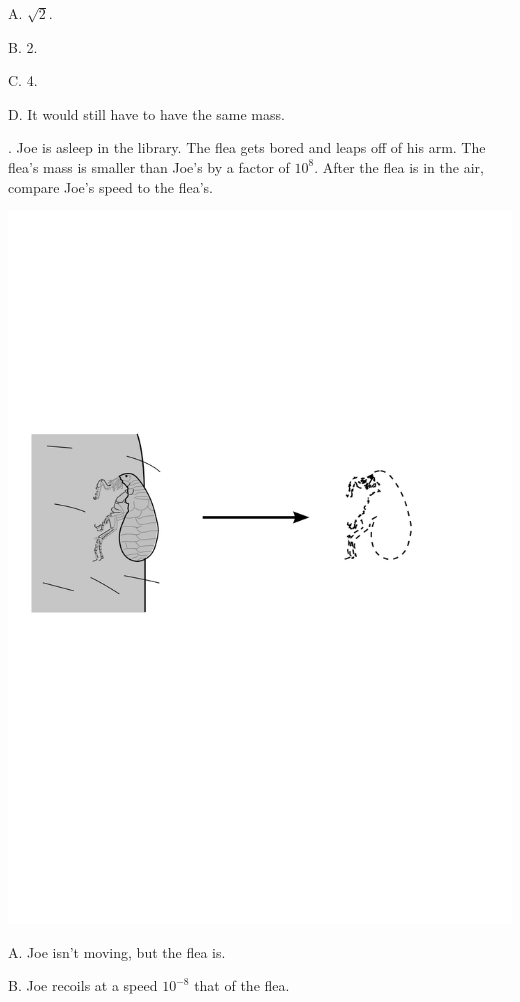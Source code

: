 \documentclass[20pt]{extarticle}
\begin{document}
A. $\sqrt{2}$.

B. 2.

C. 4.

D. It would still have to have the same mass.



\pagebreak


. Joe is asleep in the library.
The flea gets bored and leaps off of his arm. The flea's mass is smaller than
Joe's by a factor of $10^8$. After the flea is in the air, compare Joe's speed to the flea's.

\includegraphics{figs/flea}

A. Joe isn't moving, but the flea is.

B. Joe recoils at a speed $10^{-8}$ that of the flea.
\end{document}
